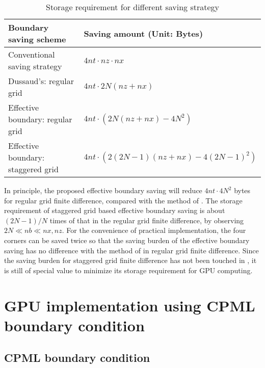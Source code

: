 \begin{table*}
  \centering
  \caption{Storage requirement for different saving strategy}\label{table:3}
  \begin{tabular}{l|l}
     \hline
     Boundary saving scheme	  			&  Saving amount (Unit: Bytes)\\
     \hline
     Conventional saving strategy			&  $4 nt\cdot nz\cdot nx$ \\
     Dussaud's: regular grid				&  $4 nt\cdot2N(nz+nx) $ \\
     Effective boundary: regular grid			&  $4 nt\cdot(2N(nz+nx)-4N^2) $	\\
     Effective boundary: staggered grid			&  $4 nt\cdot(2(2N-1)(nz+nx)-4(2N-1)^2) $ \\
     \hline
   \end{tabular}
\end{table*}

In principle, the proposed effective boundary saving will reduce $4nt\cdot 4N^2$ bytes for regular grid finite difference, compared with the method of \cite{dussaud2008computational}. The storage requirement of staggered grid based effective boundary saving is about $(2N-1)/N$ times of that in the regular grid finite difference, by observing $2N\ll nb\ll nx,nz$. For the convenience of practical implementation, the four corners can be saved twice so that the saving burden of the effective boundary saving has no difference with the method of \cite{dussaud2008computational} in regular grid finite difference. Since the saving burden for staggered grid finite difference has not been touched in \cite{dussaud2008computational}, it is still of special value to minimize its storage requirement for GPU computing.

\section{GPU implementation using CPML boundary condition}

\subsection{CPML boundary condition}

